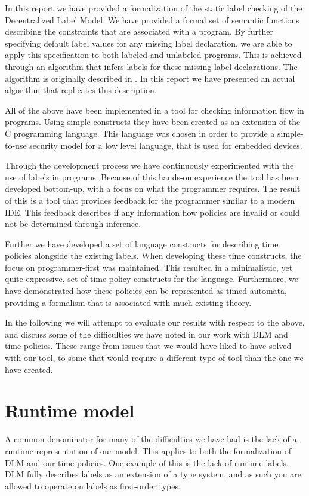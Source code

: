 In this report we have provided a formalization of the static label checking of the Decentralized Label Model.
We have provided a formal set of semantic functions describing the constraints that are associated with a program.
By further specifying default label values for any missing label declaration, we are able to apply this specification to both labeled and unlabeled programs.
This is achieved through an algorithm that infers labels for these missing label declarations.
The algorithm is originally described in \cite{myers1997}.
In this report we have presented an actual algorithm that replicates this description.

All of the above have been implemented in a tool for checking information flow in programs.
Using simple constructs they have been created as an extension of the C programming language.
This language was chosen in order to provide a simple-to-use security model for a low level language, that is used for embedded devices.

Through the development process we have continuously experimented with the use of labels in programs.
Because of this hands-on experience the tool has been developed bottom-up, with a focus on what the programmer requires.
The result of this is a tool that provides feedback for the programmer similar to a modern IDE.
This feedback describes if any information flow policies are invalid or could not be determined through inference.

Further we have developed a set of language constructs for describing time policies alongside the existing labels.
When developing these time constructs, the focus on programmer-first was maintained.
This resulted in a minimalistic, yet quite expressive, set of time policy constructs for the language.
Furthermore, we have demonstrated how these policies can be represented as timed automata, providing a formalism that is associated with much existing theory.

In the following we will attempt to evaluate our results with respect to the above, and discuss some of the difficulties we have noted in our work with DLM and time policies.
These range from issues that we would have liked to have solved with our tool, to some that would require a different type of tool than the one we have created.

\section{Runtime model}
A common denominator for many of the difficulties we have had is the lack of a runtime representation of our model.
This applies to both the formalization of DLM and our time policies.
One example of this is the lack of runtime labels.
DLM fully describes labels as an extension of a type system, and as such you are allowed to operate on labels as first-order types.

